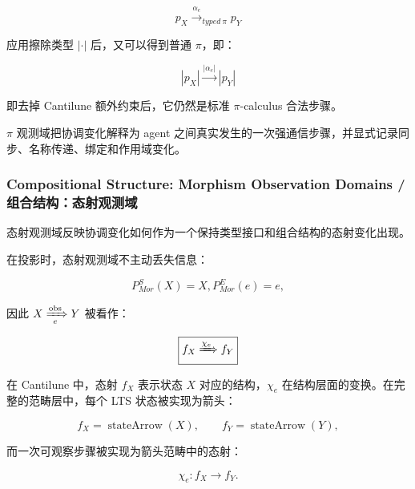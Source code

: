  \begin{equation}
    \boxed{
      p_X \xrightarrow{\alpha_e}_{typed\ \pi} p_Y
    }
    \label{eq:typed-pi-transition}
  \end{equation}

  应用擦除类型 $|\cdot|$ 后，又可以得到普通 $\pi$，即：

  \begin{equation}
    \boxed{ |p_X| \xrightarrow{|\alpha_e|} |p_Y|}
    \label{eq:pi-erasure-transition}
  \end{equation}

  即去掉 Cantilune 额外约束后，它仍然是标准 $\pi$-calculus 合法步骤。

  $\pi$ 观测域把协调变化解释为 agent 之间真实发生的一次强通信步骤，并显式记录同步、名称传递、绑定和作用域变化。

  \subsubsection{Compositional Structure: Morphism Observation Domains / 组合结构：态射观测域}

  态射观测域反映协调变化如何作为一个保持类型接口和组合结构的态射变化出现。

  在投影时，态射观测域不主动丢失信息：

  \begin{equation}
    \boxed{ P_{Mor}^{S}(X)=X,P_{Mor}^{E}(e)=e, }
    \label{eq:morphism-identity-projection}
  \end{equation}

  因此 $X\xRightarrow[e]{\mathrm{obs}}Y$ 被看作：

  \begin{equation}
    \boxed{ f_X \xRightarrow{\chi_e} f_Y }
    \label{eq:morphism-observed-transition}
  \end{equation}

  在 Cantilune 中，态射 $f_{X}$ 表示状态 $X$ 对应的结构，$\chi_e$ 在结构层面的变换。在完整的范畴层中，每个 LTS 状态被实现为箭头：

  \begin{equation}
    \boxed{
      f_X=\operatorname{stateArrow}(X),
      \qquad
      f_Y=\operatorname{stateArrow}(Y),
    }
    \label{eq:morphism-state-arrows}
  \end{equation}

  而一次可观察步骤被实现为箭头范畴中的态射：

  \begin{equation}
    \boxed{
      \chi_e:f_X\longrightarrow f_Y.
    }
    \label{eq:morphism-event-arrow}
  \end{equation}

